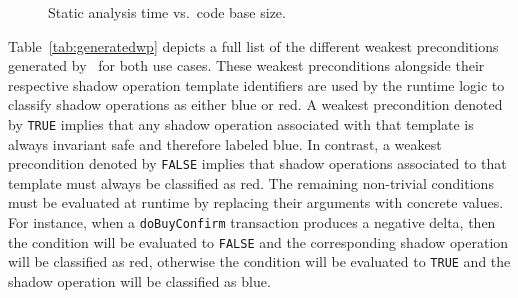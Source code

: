 \begin{figure}[t!]
\centering
{}
\par\bigskip
{}
\caption{Static analysis time vs.\ code base size.}
\label{fig:compDiffSize}
\end{figure}

Table~\ref{tab:generatedwp} depicts a full list of the different weakest preconditions
generated by \tool\ for both use cases. These weakest preconditions alongside their 
respective shadow operation template identifiers are used by the runtime logic to classify shadow operations as either blue or red. 
A weakest precondition denoted by \texttt{TRUE} implies that any shadow operation associated
with that template is always invariant safe and therefore labeled blue.
In contrast, a weakest precondition denoted by \texttt{FALSE} implies that shadow operations
associated to that template must always be classified as red.
The remaining non-trivial conditions must be evaluated at runtime by replacing their 
arguments with concrete values. For
instance, when a \texttt{doBuyConfirm} transaction produces a negative delta, then
the condition will be evaluated to \texttt{FALSE} and the corresponding shadow operation will
be classified as red, otherwise the condition will be evaluated to \texttt{TRUE} and the 
shadow operation will be classified as blue.

